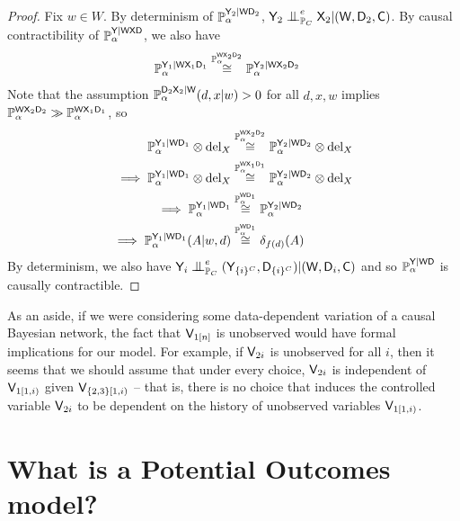 \begin{proof}
Fix $w\in W$. By determinism of $\mathbb{P}_\alpha^{\mathsf{Y}_2|\mathsf{W}\mathsf{D}_2}$, $\RV{Y}_2\CI^e_{\prob{P}_C} \RV{X}_2|(\RV{W},\RV{D}_2,\RV{C})$. By causal contractibility of $\mathbb{P}_\alpha^{\mathsf{Y}|\mathsf{WXD}}$, we also have
\begin{align}
    \mathbb{P}_\alpha^{\mathsf{Y}_1|\mathsf{W}\mathsf{X}_1\mathsf{D}_1} &\overset{\mathbb{P}_\alpha^{\mathsf{WX}_2\mathsf{D}_2}}{\cong} \mathbb{P}_\alpha^{\mathsf{Y}_2|\mathsf{W}\mathsf{X}_2\mathsf{D}_2}
\end{align}
Note that the assumption $\mathbb{P}_\alpha^{\mathsf{D}_2\mathsf{X}_2|\mathsf{W}}(d,x|w)>0$ for all $d,x,w$ implies $\mathbb{P}_\alpha^{\mathsf{WX}_2\mathsf{D}_2}\gg \mathbb{P}_\alpha^{\mathsf{WX}_1\mathsf{D}_1}$, so
\begin{align}
    \mathbb{P}_\alpha^{\mathsf{Y}_1|\mathsf{W}\mathsf{D}_1}\otimes \mathrm{del}_X &\overset{\mathbb{P}_\alpha^{\mathsf{WX}_2\mathsf{D}_2}}{\cong} \mathbb{P}_\alpha^{\mathsf{Y}_2|\mathsf{W}\mathsf{D}_2}\otimes \mathrm{del}_X\\
    \implies \mathbb{P}_\alpha^{\mathsf{Y}_1|\mathsf{W}\mathsf{D}_1}\otimes \mathrm{del}_X &\overset{\mathbb{P}_\alpha^{\mathsf{WX}_1\mathsf{D}_1}}{\cong} \mathbb{P}_\alpha^{\mathsf{Y}_2|\mathsf{W}\mathsf{D}_2}\otimes \mathrm{del}_X\\
    \implies \mathbb{P}_\alpha^{\mathsf{Y}_1|\mathsf{W}\mathsf{D}_1} &\overset{\mathbb{P}_\alpha^{\mathsf{W}\mathsf{D}_1}}{\cong}\mathbb{P}_\alpha^{\mathsf{Y}_2|\mathsf{W}\mathsf{D}_2}\\
    \implies \mathbb{P}_\alpha^{\mathsf{Y}_1|\mathsf{W}\mathsf{D}_1}(A|w,d) &\overset{\mathbb{P}_\alpha^{\mathsf{W}\mathsf{D}_1}}{\cong} \delta_{f(d)}(A)
\end{align}
By determinism, we also have $\RV{Y}_i\CI^e_{\prob{P}_C} (\RV{Y}_{\{i\}^C},\RV{D}_{\{i\}^C})|(\RV{W},\RV{D}_i,\RV{C})$ and so $\mathbb{P}_\alpha^{\mathsf{Y}|\mathsf{WD}}$ is causally contractible.
\end{proof}


As an aside, if we were considering some data-dependent variation of a causal Bayesian network, the fact that $\mathsf{V}_{1[n]}$ is unobserved would have formal implications for our model. For example, if $\mathsf{V}_{2i}$ is unobserved for all $i$, then it seems that we should assume that under every choice, $\mathsf{V}_{2i}$ is independent of $\mathsf{V}_{1[1,i)}$ given $\mathsf{V}_{\{2,3\}[1,i)}$ -- that is, there is no choice that induces the controlled variable $\mathsf{V}_{2i}$ to be dependent on the history of unobserved variables $\mathsf{V}_{1[1,i)}$.


\section{What is a Potential Outcomes model?}

